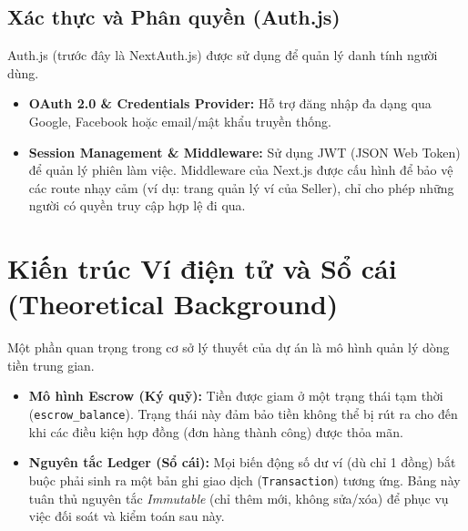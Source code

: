 \documentclass[../main.tex]{subfiles}
\begin{document}
\subsection{Xác thực và Phân quyền (Auth.js)}
Auth.js (trước đây là NextAuth.js) được sử dụng để quản lý danh tính người dùng.
\begin{itemize}
    \item \textbf{OAuth 2.0 \& Credentials Provider:} Hỗ trợ đăng nhập đa dạng qua Google, Facebook hoặc email/mật khẩu truyền thống.
    \item \textbf{Session Management \& Middleware:} Sử dụng JWT (JSON Web Token) để quản lý phiên làm việc. Middleware của Next.js được cấu hình để bảo vệ các route nhạy cảm (ví dụ: trang quản lý ví của Seller), chỉ cho phép những người có quyền truy cập hợp lệ đi qua.
\end{itemize}

\section{Kiến trúc Ví điện tử và Sổ cái (Theoretical Background)}
Một phần quan trọng trong cơ sở lý thuyết của dự án là mô hình quản lý dòng tiền trung gian.
\begin{itemize}
    \item \textbf{Mô hình Escrow (Ký quỹ):} Tiền được giam ở một trạng thái tạm thời (\texttt{escrow\_balance}). Trạng thái này đảm bảo tiền không thể bị rút ra cho đến khi các điều kiện hợp đồng (đơn hàng thành công) được thỏa mãn.
    \item \textbf{Nguyên tắc Ledger (Sổ cái):} Mọi biến động số dư ví (dù chỉ 1 đồng) bắt buộc phải sinh ra một bản ghi giao dịch (\texttt{Transaction}) tương ứng. Bảng này tuân thủ nguyên tắc \textit{Immutable} (chỉ thêm mới, không sửa/xóa) để phục vụ việc đối soát và kiểm toán sau này.
\end{itemize}
\end{document}
